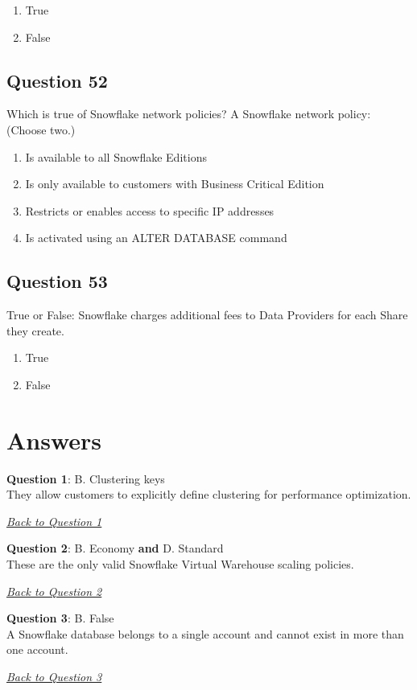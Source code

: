 \documentclass[12pt]{article}
\newcommand{\answer}[2]{%
  \textbf{Question #1}\label{ans:#1}: #2\par
  \smallskip\emph{\hyperref[q:#1]{Back to Question #1}}\par\medskip
}
\begin{document}
\begin{enumerate}[label=\Alph*.]
  \item True
  \item False
\end{enumerate}

\subsection*{Question 52}
Which is true of Snowflake network policies? A Snowflake network policy: (Choose two.)

\begin{enumerate}[label=\Alph*.]
  \item Is available to all Snowflake Editions
  \item Is only available to customers with Business Critical Edition
  \item Restricts or enables access to specific IP addresses
  \item Is activated using an ALTER DATABASE command
\end{enumerate}

\subsection*{Question 53}
True or False: Snowflake charges additional fees to Data Providers for each Share they create.

\begin{enumerate}[label=\Alph*.]
  \item True
  \item False
\end{enumerate}

\newpage
\section*{Answers}

\answer{1}{B. Clustering keys\\
They allow customers to explicitly define clustering for performance optimization.}

\answer{2}{B. Economy \textbf{and} D. Standard\\
These are the only valid Snowflake Virtual Warehouse scaling policies.}

\answer{3}{B. False\\
A Snowflake database belongs to a single account and cannot exist in more than one account.}
\end{document}
